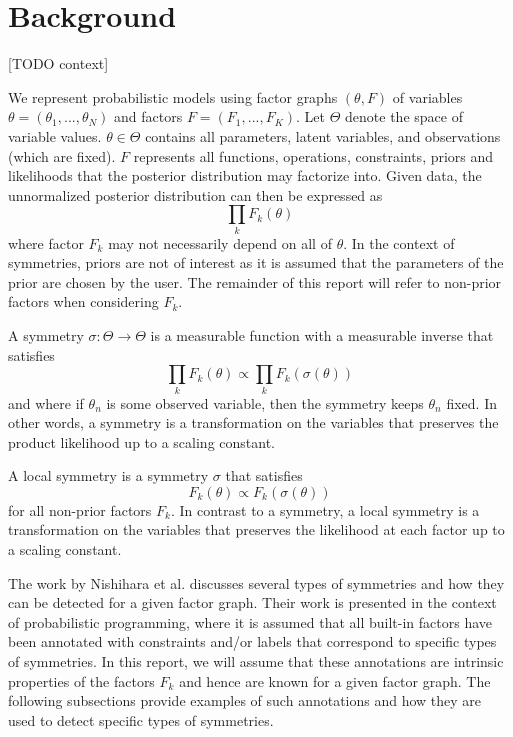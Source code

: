 

\section{Background}

[TODO context]

\cite{Nishihara:2013}

We represent probabilistic models using factor graphs $(\theta,F)$ of variables $\theta=(\theta_1,...,\theta_N)$ and factors $F=(F_1,...,F_K)$. Let $\Theta$ denote the space of variable values. $\theta\in\Theta$ contains all parameters, latent variables, and observations (which are fixed). $F$ represents all functions, operations, constraints, priors and likelihoods that the posterior distribution may factorize into. Given data, the unnormalized posterior distribution can then be expressed as
\[
\prod_kF_k(\theta)
\]
where factor $F_k$ may not necessarily depend on all of $\theta$. In the context of symmetries, priors are not of interest as it is assumed that the parameters of the prior are chosen by the user. The remainder of this report will refer to non-prior factors when considering $F_k$.

A symmetry $\sigma:\Theta\rightarrow\Theta$ is a measurable function with a measurable inverse that satisfies
\[
\prod_kF_k(\theta) \propto \prod_kF_k(\sigma(\theta))
\]
and where if $\theta_n$ is some observed variable, then the symmetry keeps $\theta_n$ fixed. In other words, a symmetry is a transformation on the variables that preserves the product likelihood up to a scaling constant.

A local symmetry is a symmetry $\sigma$ that satisfies
\[
F_k(\theta) \propto F_k\left(\sigma(\theta)\right)
\]
for all non-prior factors $F_k$. In contrast to a symmetry, a local symmetry is a transformation on the variables that preserves the likelihood at each factor up to a scaling constant.

The work by Nishihara et al. discusses several types of symmetries and how they can be detected for a given factor graph. Their work is presented in the context of probabilistic programming, where it is assumed that all built-in factors have been annotated with constraints and/or labels that correspond to specific types of symmetries. In this report, we will assume that these annotations are intrinsic properties of the factors $F_k$ and hence are known for a given factor graph. The following subsections provide examples of such annotations and how they are used to detect specific types of symmetries.


